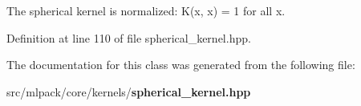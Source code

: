 The spherical kernel is normalized\-: K(x, x) = 1 for all x. 



Definition at line 110 of file spherical\-\_\-kernel.\-hpp.



The documentation for this class was generated from the following file\-:\begin{DoxyCompactItemize}
\item 
src/mlpack/core/kernels/{\bf spherical\-\_\-kernel.\-hpp}\end{DoxyCompactItemize}
